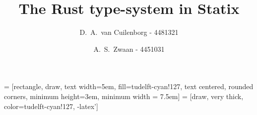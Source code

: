 \documentclass[sigplan,screen]{acmart}
\title{The Rust type-system in Statix}
\author{
D.\ A.\ van Cuilenborg - 4481321
\and
A.\ S.\ Zwaan - 4451031}
\begin{document}
\renewcommand{\sectionautorefname}{Section}
\renewcommand{\chapterautorefname}{Chapter}
\let\subsectionautorefname\sectionautorefname
\let\subsubsectionautorefname\sectionautorefname

\newcommand{\lowspacingitem}[0]{\itemsep0.2em}


\newcommand{\nl}[0]{\bigbreak

}

 = [rectangle, draw, text width=5em, fill=tudelft-cyan!127, text centered, rounded corners, minimum height=3em, minimum width = 7.5em]
 = [draw, very thick, color=tudelft-cyan!127, -latex']

%

\maketitle









\end{document}
